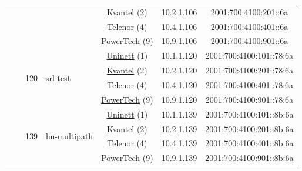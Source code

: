 \begin{small}
\begin{center}
\begin{longtable}{|c|c|c|c|c|c|c|c|}
  &  & \multicolumn{2}{|c|}{} & \multicolumn{2}{|c|}{\tiny{\href{http://kvantel.no}{Kvantel} (2)}} & \tiny{10.2.1.106} & \tiny{2001:700:4100:201::6a} \\* \cline{5-5}\cline{6-6}\cline{7-7}\cline{8-8}
  &  & \multicolumn{2}{|c|}{} & \multicolumn{2}{|c|}{\tiny{\href{https://www.telenor.no}{Telenor} (4)}} & \tiny{10.4.1.106} & \tiny{2001:700:4100:401::6a} \\* \cline{5-5}\cline{6-6}\cline{7-7}\cline{8-8}
  &  & \multicolumn{2}{|c|}{} & \multicolumn{2}{|c|}{\tiny{\href{http://www.powertech.no}{PowerTech} (9)}} & \tiny{10.9.1.106} & \tiny{2001:700:4100:901::6a} \\* \cline{3-3}\cline{4-4}\cline{5-5}\cline{6-6}\cline{7-7}\cline{8-8}
  &  & \multirow{4}{*}{\tiny{120}} & \multicolumn{1}{|l|}{\multirow{4}{*}{\tiny{srl-test}}} & \multicolumn{2}{|c|}{\tiny{\href{https://www.uninett.no}{Uninett} (1)}} & \tiny{10.1.1.120} & \tiny{2001:700:4100:101::78:6a} \\* \cline{5-5}\cline{6-6}\cline{7-7}\cline{8-8}
  &  &  &  & \multicolumn{2}{|c|}{\tiny{\href{http://kvantel.no}{Kvantel} (2)}} & \tiny{10.2.1.120} & \tiny{2001:700:4100:201::78:6a} \\* \cline{5-5}\cline{6-6}\cline{7-7}\cline{8-8}
  &  &  &  & \multicolumn{2}{|c|}{\tiny{\href{https://www.telenor.no}{Telenor} (4)}} & \tiny{10.4.1.120} & \tiny{2001:700:4100:401::78:6a} \\* \cline{5-5}\cline{6-6}\cline{7-7}\cline{8-8}
  &  &  &  & \multicolumn{2}{|c|}{\tiny{\href{http://www.powertech.no}{PowerTech} (9)}} & \tiny{10.9.1.120} & \tiny{2001:700:4100:901::78:6a} \\* \cline{3-3}\cline{4-4}\cline{5-5}\cline{6-6}\cline{7-7}\cline{8-8}
  &  & \multirow{4}{*}{\tiny{139}} & \multicolumn{1}{|l|}{\multirow{4}{*}{\tiny{hu-multipath}}} & \multicolumn{2}{|c|}{\tiny{\href{https://www.uninett.no}{Uninett} (1)}} & \tiny{10.1.1.139} & \tiny{2001:700:4100:101::8b:6a} \\* \cline{5-5}\cline{6-6}\cline{7-7}\cline{8-8}
  &  &  &  & \multicolumn{2}{|c|}{\tiny{\href{http://kvantel.no}{Kvantel} (2)}} & \tiny{10.2.1.139} & \tiny{2001:700:4100:201::8b:6a} \\* \cline{5-5}\cline{6-6}\cline{7-7}\cline{8-8}
  &  &  &  & \multicolumn{2}{|c|}{\tiny{\href{https://www.telenor.no}{Telenor} (4)}} & \tiny{10.4.1.139} & \tiny{2001:700:4100:401::8b:6a} \\* \cline{5-5}\cline{6-6}\cline{7-7}\cline{8-8}
  &  &  &  & \multicolumn{2}{|c|}{\tiny{\href{http://www.powertech.no}{PowerTech} (9)}} & \tiny{10.9.1.139} & \tiny{2001:700:4100:901::8b:6a} \\* \cline{3-3}\cline{4-4}\cline{5-5}\cline{6-6}\cline{7-7}\cline{8-8}

\end{longtable}
\end{center}
\end{small}
